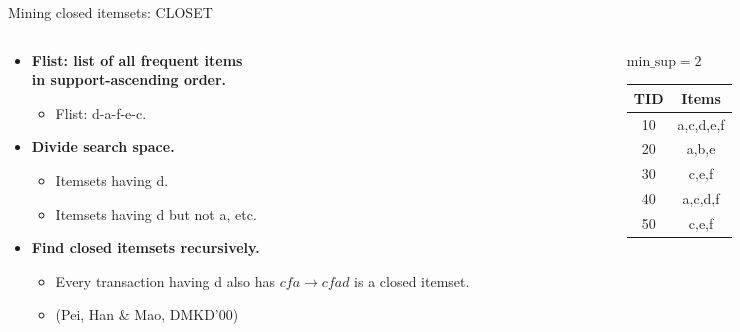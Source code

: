 \documentclass[aspectratio=169,t,xcolor=dvipsnames]{beamer}
\begin{document}
  {
    \begin{frame}{Mining closed itemsets: CLOSET}
      \begin{columns}
        \begin{column}{0.6\textwidth}
        \begin{itemize}
            \item \textbf{Flist: list of all frequent items \\ in support-ascending order.}
            \begin{itemize}
              \item Flist: d-a-f-e-c.
            \end{itemize}
            \item \textbf{Divide search space.}
            \begin{itemize}
              \item Itemsets having d.
              \item Itemsets having d but not a, etc.
            \end{itemize}
            \item \textbf{Find closed itemsets recursively.}
            \begin{itemize}
              \item Every transaction having d also has $cfa \rightarrow cfad$ is a closed itemset.
              \item (Pei, Han \& Mao, DMKD'00)
            \end{itemize}
        \end{itemize}
      \end{column}
      \begin{column}{0.3\textwidth}
        $\text{min\_sup} =2$ \\[0.2cm]
        \begin{tabular}{|c|c|}
          \hline
          TID & Items \\\hline
          10 & a,c,d,e,f \\\hline
          20 & a,b,e \\\hline
          30 & c,e,f \\\hline
          40 & a,c,d,f \\\hline
          50 & c,e,f \\\hline
        \end{tabular}
      \end{column}
      \end{columns}
    \end{frame}
  }
\end{document}

